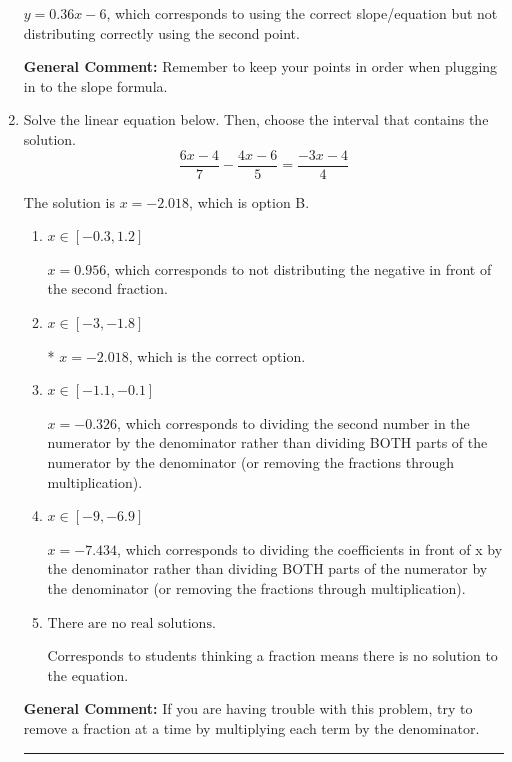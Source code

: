 \documentclass{extbook}[14pt]
\newcommand{\litem}[1]{\item #1

\rule{\textwidth}{0.4pt}}
\begin{document}
\begin{enumerate}
{\begin{enumerate}[label=\Alph*.]
 $y = 0.36x -6$, which corresponds to using the correct slope/equation but not distributing correctly using the second point.
\end{enumerate}

\textbf{General Comment:} Remember to keep your points in order when plugging in to the slope formula.
}
\litem{
Solve the linear equation below. Then, choose the interval that contains the solution.
\[ \frac{6x -4}{7} - \frac{4x -6}{5} = \frac{-3x -4}{4} \]

The solution is \( x = -2.018 \), which is option B.\begin{enumerate}[label=\Alph*.]
\item \( x \in [-0.3, 1.2] \)

 $x = 0.956$, which corresponds to not distributing the negative in front of the second fraction.
\item \( x \in [-3, -1.8] \)

* $x = -2.018$, which is the correct option.
\item \( x \in [-1.1, -0.1] \)

 $x = -0.326$, which corresponds to dividing the second number in the numerator by the denominator rather than dividing BOTH parts of the numerator by the denominator (or removing the fractions through multiplication).
\item \( x \in [-9, -6.9] \)

 $x = -7.434$, which corresponds to dividing the coefficients in front of x by the denominator rather than dividing BOTH parts of the numerator by the denominator (or removing the fractions through multiplication).
\item \( \text{There are no real solutions.} \)

Corresponds to students thinking a fraction means there is no solution to the equation.
\end{enumerate}

\textbf{General Comment:} If you are having trouble with this problem, try to remove a fraction at a time by multiplying each term by the denominator.
}
\end{enumerate}
\end{document}
